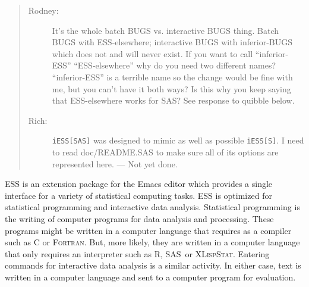 \documentclass{article}
\newcommand*{\SAS}{\textsc{SAS}}
\newcommand*{\XLispStat}{\textsc{XLispStat}}
\newcommand*{\Fortran}{\textsc{Fortran}}
\newcommand{\stexttt}[1]{{\small\texttt{#1}}}
\newenvironment{Comment}{\begin{quote}\small\itshape }{\end{quote}}
\begin{document}
\begin{Comment}
\begin{description}
\item[Rodney:] It's the whole batch BUGS vs. interactive BUGS thing.  Batch 
BUGS with ESS-elsewhere; interactive BUGS with inferior-BUGS which does not 
and will never exist.  If you want to call ``inferior-ESS'' ``ESS-elsewhere'' 
why do you need two different names?  ``inferior-ESS'' is a terrible name
so the change would be fine with me, but you can't have it both ways?  Is
this why you keep saying that ESS-elsewhere works for SAS?  See
response to quibble below.

\item[Rich:]
\stexttt{iESS[SAS]} was designed to mimic as well as possible \stexttt{iESS[S]}.
I need to read doc/README.SAS to make sure all of its options are represented
here. --- Not yet done.
\end{description}
\end{Comment}

ESS is an extension package for
the Emacs editor which provides a single interface for a variety of
statistical computing tasks.  ESS is optimized for statistical programming
and interactive data analysis.  Statistical programming is the writing of
computer programs for data analysis and processing.  These programs might be
written in a computer language that requires as a compiler such as C or
\Fortran.  But, more likely, they are written in a  computer
language that only requires an interpreter such as R, \SAS\ or \XLispStat.
Entering commands for interactive data analysis is a similar activity.
In either case, text is written in a computer language and sent to a
computer program for evaluation.
\end{document}
